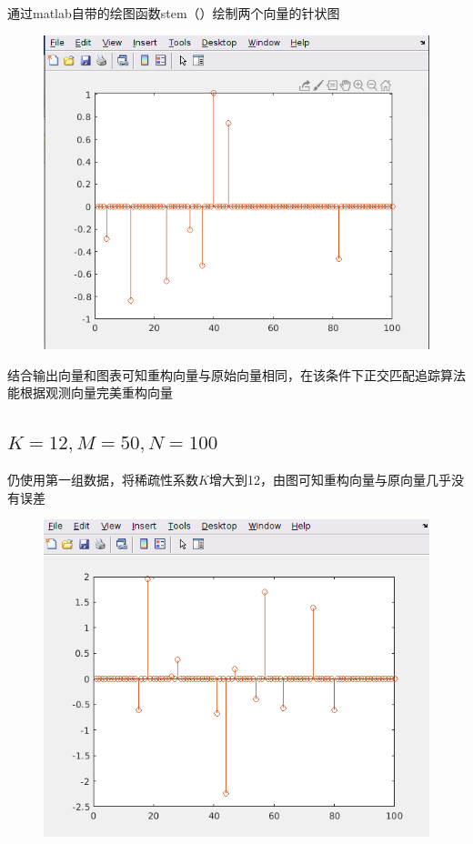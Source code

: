 \documentclass{article}
\begin{document}
通过matlab自带的绘图函数stem（）绘制两个向量的针状图
\begin{figure}[H]
	\centering
	\includegraphics[scale=0.6]{k8.png}
\end{figure}
结合输出向量和图表可知重构向量与原始向量相同，在该条件下正交匹配追踪算法能根据观测向量完美重构向量

\subsection{$ K=12,M=50,N=100 $}
仍使用第一组数据，将稀疏性系数$ K $增大到12，由图可知重构向量与原向量几乎没有误差
\begin{figure}[H]
	\centering
	\includegraphics[scale=0.6]{k12.png}
\end{figure}
\end{document}
